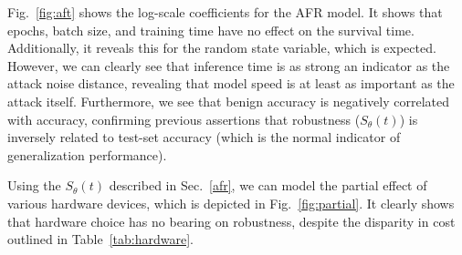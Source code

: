 \documentclass[journal]{IEEEtran}
\begin{document}
Fig.~\ref{fig:aft} shows the log-scale coefficients for the AFR model. It shows that epochs, batch size, and training time have no effect on the survival time. Additionally, it reveals this for the random state variable, which is expected. However, we can clearly see that inference time  is as strong an indicator as the attack noise distance, revealing that model speed is at least as important as the attack itself. Furthermore, we see that benign accuracy is negatively correlated with accuracy, confirming previous assertions that robustness ($S_{\theta}(t)$) is inversely related to test-set accuracy (which is the normal indicator of generalization performance)\cite{carlini_towards_2017}.

Using the $S_{\theta}(t)$ described in Sec.~\ref{afr}, we can model the partial effect of various hardware devices, which is depicted in Fig.~\ref{fig:partial}. It clearly shows that hardware choice has no bearing on robustness, despite the disparity in cost outlined in Table~\ref{tab:hardware}.
\end{document}

